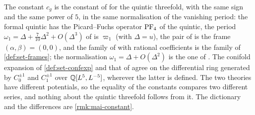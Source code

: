 \begin{rmk}
\label{rmk:int-constant}
The constant $c_g$ is the constant of \cite[Conjecture~1.5]{CGYZ26} for the quintic threefold, with the same sign and the same power of $5$, in the same normalisation of the vanishing period: the formal quintic has the Picard--Fuchs operator $\mathrm{PF}_{4}$ of the quintic, the period $\omega_1=\Delta+\frac7{10}\Delta^2+O(\Delta^3)$ of \cite[Example~1.3]{CGYZ26} is $\varpi_1$ (with $\Delta=u$), the pair of \cite[Example~1.3]{CGYZ26} is the frame $(\alpha,\beta)=(0,0)$, and the family of \cite[Remark~1.4]{CGYZ26} with rational coefficients is the family of \cref{def:set-frames}; the normalisation $\omega_1=\Delta+O(\Delta^2)$ is the one of \cite[Example~1.3; \S4.2, Proposition-Definition~4.5 (1)]{CGYZ26}. The conifold expansion of \cref{def:set-confexp} and that of \cite[Definition~1.2]{CGYZ26} agree on the differential ring generated by $C_0^{\pm1}$ and $C_1^{\pm1}$ over $\mathbb{Q}[L^5,L^{-5}]$, wherever the latter is defined. The two theories have different potentials, so the equality of the constants compares two different series, and nothing about the quintic threefold follows from it. The dictionary and the differences are \cref{rmk:mai-constant}. 
\end{rmk}


